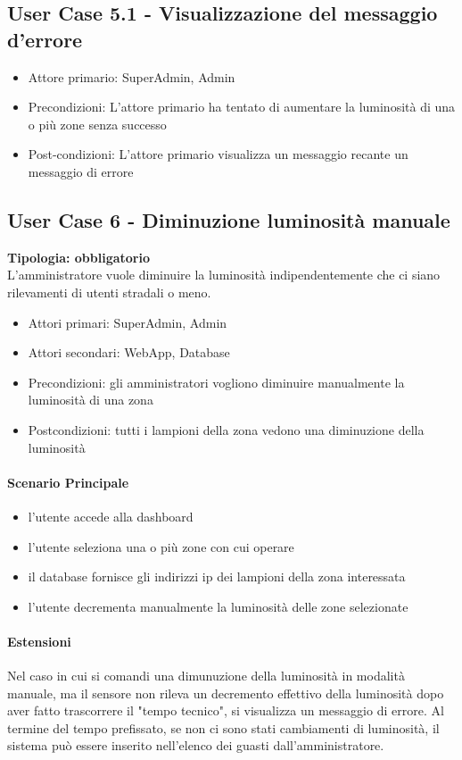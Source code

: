 \documentclass[12pt]{article}
\begin{document}
\subsection{User Case 5.1 - Visualizzazione del messaggio d'errore}
\begin{itemize}
	\item Attore primario: SuperAdmin, Admin
	\item Precondizioni: L'attore primario ha tentato di aumentare la luminosità di una o più zone senza successo
	\item Post-condizioni: L'attore primario visualizza un messaggio recante un messaggio di errore
\end{itemize}

\subsection{User Case 6 - Diminuzione luminosità manuale}
\textbf{Tipologia: obbligatorio} \\
L'amministratore vuole diminuire la luminosità indipendentemente che ci siano rilevamenti di utenti stradali o meno.
\begin{itemize}
	\item Attori primari: SuperAdmin, Admin
	\item Attori secondari: WebApp, Database
	\item Precondizioni: gli amministratori vogliono diminuire manualmente la luminosità di una zona
	\item Postcondizioni: tutti i lampioni della zona vedono una diminuzione della luminosità
\end{itemize}
\paragraph{Scenario Principale}
\begin{itemize}
	\item l'utente accede alla dashboard
	\item l'utente seleziona una o più zone con cui operare
 	\item il database fornisce gli indirizzi ip dei lampioni della zona interessata
	\item l'utente decrementa manualmente la luminosità delle zone selezionate
\end{itemize}
\paragraph{Estensioni} Nel caso in cui si comandi una dimunuzione della luminosità in modalità manuale, ma il sensore non rileva un decremento effettivo della luminosità dopo aver fatto trascorrere il "tempo tecnico", si visualizza un messaggio di errore.
Al termine del tempo prefissato, se non ci sono stati cambiamenti di luminosità, il sistema può essere inserito nell'elenco dei guasti dall'amministratore.
\end{document}
